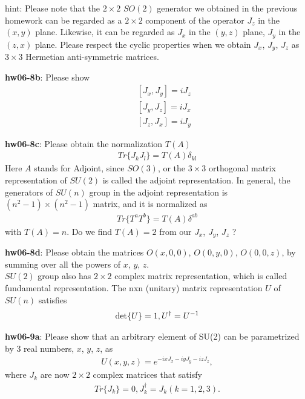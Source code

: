 \documentclass[12pt]{article}
\begin{document}
hint: Please note that the $2\times 2$ $SO(2)$ generator we obtained in the
  previous homework can be regarded as a $2 \times 2$ component of the
  operator $J_z$ in the $(x,y)$ plane. Likewise, it can be regarded
  as $J_x$ in the $(y,z)$ plane, $J_y$ in the $(z,x)$ plane. Please respect
  the cyclic properties when we obtain $J_x$, $J_y$, $J_z$ as $3 \times 3$
  Hermetian anti-symmetric matrices.

{\bf hw06-8b}: Please show 
\begin{eqnarray}
  &&[ J_x, J_y ] = i J_z \\
  &&[ J_y, J_z ] = i J_x \\
  &&[ J_z, J_x ] = i J_y
\end{eqnarray}

                                          
{\bf hw06-8c}: Please obtain the normalization $T(A)$
\begin{eqnarray}
  Tr\{ J_k J_l \} = T(A) \delta_{kl}
\end{eqnarray}
   Here $A$ stands for Adjoint, since $SO(3)$, or the $3\times 3$ orthogonal matrix
  representation of $SU(2)$ is called the adjoint representation. In
  general, the generators of $SU(n)$ group in the adjoint representation
  is $(n^2-1) \times (n^2-1)$ matrix, and it is normalized as
\begin{eqnarray}
  Tr\{ T^a T^b \} = T(A) \delta^{ab}
\end{eqnarray}
  with $T(A) = n$.  Do we find $T(A) = 2$ from our $J_x$, $J_y$, $J_z$ ?

{\bf hw06-8d}:  Please obtain the matrices $O(x,0,0)$, $O(0,y,0)$, $O(0,0,z)$,
  by summing over all the powers of $x$, $y$, $z$. \\

  $SU(2)$ group also has $2\times 2$ complex matrix representation, which
  is called fundamental representation.  The nxn (unitary) matrix
  representation $U$ of $SU(n)$ satisfies
\begin{eqnarray}
  {\rm det}\{U\} = 1, U^\dagger = U^{-1}
\end{eqnarray}
 

{\bf hw06-9a}:  Please show that an arbitrary element of SU(2) can be
  parametrized by $3$ real numbers, $x$, $y$, $z$, as
\begin{eqnarray}
  U(x,y,z) = e^{ -i x J_x -i y J_y -i z J_z },
\end{eqnarray}
  where $J_k$ are now $2\times 2$ complex matrices that satisfy
\begin{eqnarray}
  Tr\{J_k\} = 0, J_k^\dagger = J_k  (k=1,2,3).
\end{eqnarray}
 
\end{document}
